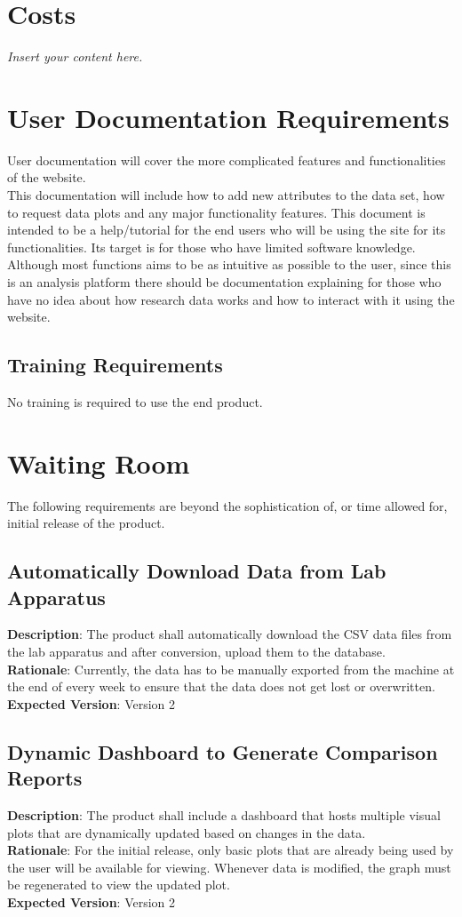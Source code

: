 \documentclass[12pt]{article}
\newcommand{\lips}{\textit{Insert your content here.}}
\begin{document}
\section{Costs}
\lips
\section{User Documentation Requirements}
User documentation will cover the more complicated features and functionalities of the website.\\

\noindent This documentation will include how to add new attributes to the data set, how
to request data plots and any major functionality features. \newline
This document is intended to be a help/tutorial for the end users who will be
using the site for its functionalities. Its target is for those who have limited
software knowledge. Although most functions aims to be as intuitive as possible
to the user, since this is an analysis platform there should be documentation
explaining for those who have no idea about how research data works and how to
interact with it using the website.

\subsection{Training Requirements}
No training is required to use the end product. 

\section{Waiting Room}
The following requirements are beyond the sophistication of, or time allowed for, initial release of the product.
\subsection{Automatically Download Data from Lab Apparatus}
\textbf{Description}: The product shall automatically download the CSV data files from the lab apparatus and after conversion, upload them to the database.\\
\textbf{Rationale}: Currently, the data has to be manually exported from the machine at the end of every week to ensure that the data does not get lost or overwritten.\\
\textbf{Expected Version}: Version 2

\subsection{Dynamic Dashboard to Generate Comparison Reports}
\textbf{Description}: The product shall include a dashboard that hosts multiple visual plots that are dynamically updated based on changes in the data.\\
\textbf{Rationale}: For the initial release, only basic plots that are already being used by the user will be available for viewing. Whenever data is modified, the graph
must be regenerated to view the updated plot.\\
\textbf{Expected Version}: Version 2
\end{document}
